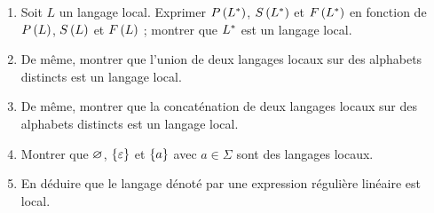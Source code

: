 \begin{corr}
\end{corr}

\begin{exo}
\begin{enumerate}
    \item Soit \(L\) un langage local. Exprimer \(P\left(L^{*}\right)\), \(S\left(L^{*}\right)\) et \(F\left(L^{*}\right)\) en fonction de \(P\left(L\right)\), \(S\left(L\right)\) et \(F\left(L\right)\) ; montrer que \(L^{*}\) est un langage local. \\
    \item De même, montrer que l'union de deux langages locaux sur des alphabets distincts est un langage local. \\
    \item De même, montrer que la concaténation de deux langages locaux sur des alphabets distincts est un langage local. \\
    \item Montrer que \(\varnothing\), \(\left\lbrace\varepsilon\right\rbrace\) et \(\left\lbrace a\right\rbrace\) avec \(a\in\Sigma\) sont des langages locaux. \\
    \item En déduire que le langage dénoté par une expression régulière linéaire est local.
\end{enumerate}
\end{exo}

\begin{corr}
\end{corr}
